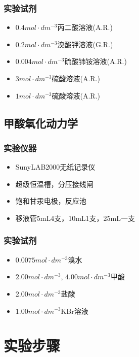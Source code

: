 \documentclass[12pt,hyperref,a4paper,UTF8]{ctexart}
\begin{document}
\subsubsection{实验试剂}
\begin{itemize}
    \item $0.4mol\cdot dm^{-3}$丙二酸溶液(A.R.)
    \item $0.2mol\cdot dm^{-3}$溴酸钾溶液(G.R.)
    \item $0.004mol\cdot dm^{-3}$硫酸铈铵溶液(A.R.)
    \item $3mol\cdot dm^{-3}$硫酸溶液(A.R.)
    \item $1mol\cdot dm^{-3}$硫酸溶液(A.R.)
\end{itemize}

\subsection{甲酸氧化动力学}
\subsubsection{实验仪器}
\begin{itemize}
    \item SunyLAB2000无纸记录仪
    \item 超级恒温槽，分压接线闸
    \item 饱和甘汞电极，反应池
    \item 移液管5mL4支，10mL1支，25mL一支
\end{itemize}

\subsubsection{实验试剂}
\begin{itemize}
    \item  $0.0075mol\cdot dm^{-3}$溴水
    \item  $2.00mol\cdot dm^{-3}$,  $4.00mol\cdot dm^{-3}$甲酸
    \item  $2.00mol\cdot dm^{-3}$盐酸
    \item  $1.00mol\cdot dm^{-3}$KBr溶液
\end{itemize}


\section{实验步骤}
\end{document}
